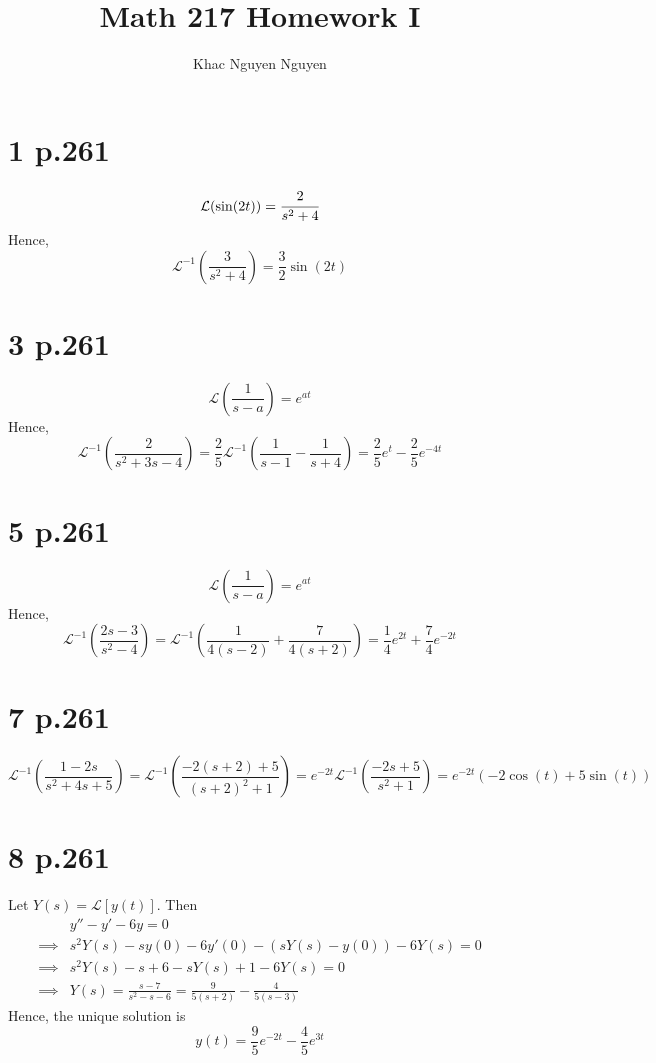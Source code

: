 \documentclass[11pt]{article}
\title{\textbf{Math 217 Homework I}}
\author{Khac Nguyen Nguyen}
\date{}
\begin{document}
\section*{1 p.261}
\[
    \mathcal{L}(\sin(2t)) = \cfrac{2}{s^2+4}
\]
Hence, 
\[
    \mathcal{L}^{-1}\left(\frac{3}{s^2+4}\right) = \frac{3}{2}\sin(2t)    
\]
\newpage
\section*{3 p.261}
\[
    \mathcal{L}(\frac{1}{s-a}) = e^{at}
\]
Hence, 
\[
    \mathcal{L}^{-1}\left(\frac{2}{s^2+3s-4}\right) = \frac{2}{5}\mathcal{L}^{-1}\left( \frac{1}{s-1} - \frac{1}{s+4} \right) = \frac{2}{5}e^t - \frac{2}{5}e^{-4t}
\]
\newpage
\section*{5 p.261}
\[
    \mathcal{L}(\frac{1}{s-a}) = e^{at}
\]
Hence, 
\[
    \mathcal{L}^{-1}\left(\frac{2s-3}{s^2-4}\right) = \mathcal{L}^{-1}\left( \frac{1}{4(s-2)} + \frac{7}{4(s+2)} \right) = \frac{1}{4}e^{2t} + \frac{7}{4}e^{-2t}   
\]
\newpage
\section*{7 p.261}
\[
    \mathcal{L}^{-1}\left(\frac{1-2s}{s^2+4s+5} \right) = \mathcal{L}^{-1} \left(\frac{-2(s+2) + 5}{(s+2)^2 + 1} \right) = e^{-2t} \mathcal{L}^{-1} \left( \frac{-2s+5}{s^2+1} \right) = e^{-2t} \left(-2 \cos(t) + 5\sin(t)\right)
\]
\newpage
\section*{8 p.261}
Let $Y(s) = \mathcal{L}[y(t)]$. Then 
\begin{equation*}
    \begin{aligned}
        &y'' - y' -6y = 0\\
        \implies &s^2 Y(s) - sy(0) - 6y'(0) - (sY(s) - y(0)) - 6Y(s)  = 0 \\
        \implies &s^2 Y(s) - s +6 - sY(s) +1 -6Y(s) = 0 \\
        \implies &Y(s) = \frac{s-7}{s^2-s-6} = \frac{9}{5(s+2)} - \frac{4}{5(s-3)}
    \end{aligned}
\end{equation*}
Hence, the unique solution is 
\[
    y(t) = \frac{9}{5}e^{-2t} - \frac{4}{5}e^{3t}    
\]
\newpage
\end{document}
